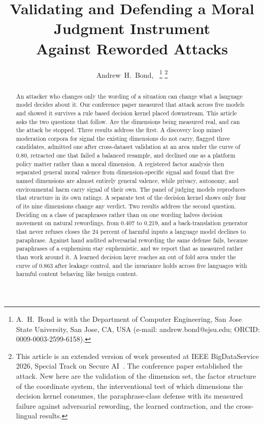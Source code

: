 \documentclass[journal]{IEEEtran}
\begin{document}
\title{Validating and Defending a Moral Judgment Instrument\\
Against Reworded Attacks}

\author{Andrew~H.~Bond,~%
\thanks{A.~H.~Bond is with the Department of Computer Engineering, San Jose
State University, San Jose, CA, USA (e-mail: andrew.bond@sjsu.edu; ORCID:
0009-0003-2599-6158).}%
\thanks{This article is an extended version of work presented at IEEE
BigDataService 2026, Special Track on Secure AI~\cite{bond2026bds}. The
conference paper established the attack. New here are the validation of the
dimension set, the factor structure of the coordinate system, the
interventional test of which dimensions the decision kernel consumes, the
paraphrase-class defense with its measured failure against adversarial
rewording, the learned contraction, and the cross-lingual results.}}

\maketitle

\begin{abstract}
An attacker who changes only the wording of a situation can change what a
language model decides about it. Our conference paper measured that attack
across five models and showed it survives a rule based decision kernel placed
downstream. This article asks the two questions that follow. Are the
dimensions being measured real, and can the attack be stopped. Three results
address the first. A discovery loop mined moderation corpora for signal the
existing dimensions do not carry, flagged three candidates, admitted one after
cross-dataset validation at an area under the curve of 0.80, retracted one
that failed a balanced resample, and declined one as a platform policy matter
rather than a moral dimension. A registered factor analysis then separated
general moral valence from dimension-specific signal and found that five named
dimensions are almost entirely general valence, while privacy, autonomy, and
environmental harm carry signal of their own. The panel of judging models
reproduces that structure in its own ratings. A separate test of the decision
kernel shows only four of its nine dimensions change any verdict. Two results
address the second question. Deciding on a class of paraphrases rather than on
one wording halves decision movement on natural rewordings, from 0.407 to
0.219, and a back-translation generator that never refuses closes the 24
percent of harmful inputs a language model declines to paraphrase. Against
hand audited adversarial rewording the same defense fails, because paraphrases
of a euphemism stay euphemistic, and we report that as measured rather than
work around it. A learned decision layer reaches an out of fold area under the
curve of 0.863 after leakage control, and the invariance holds across five
languages with harmful content behaving like benign content.
\end{abstract}
\end{document}
